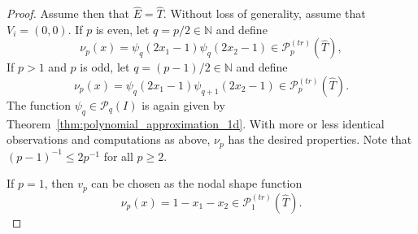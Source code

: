 \documentclass[english, 12pt, a4paper, sci, utf8, a-2b, online]{aaltothesis}
\theoremstyle{definition}
\theoremstyle{plain}
\numberwithin{equation}{section}
\begin{document}
\begin{proof}
    Assume then that $\widehat{E} = \widehat{T}$.
    Without loss of generality, assume that $V_i = (0,0)$.
    If $p$ is even, let $q = p/2 \in \mathbb{N}$ and define
    \begin{equation*}
        \nu_p(x) = \psi_q(2x_1-1) \psi_q(2x_2-1)
        \in \mathcal{P}_p^{(tr)}(\widehat{T}),
    \end{equation*}
    If $p > 1$ and $p$ is odd, let $q = (p-1)/2 \in \mathbb{N}$ and define
    \begin{equation*}
        \nu_p(x) = \psi_q(2x_1-1) \psi_{q+1}(2x_2-1)
        \in \mathcal{P}_p^{(tr)}(\widehat{T}).
    \end{equation*}
    The function $\psi_q \in \mathcal{P}_q(I)$ is again given by 
    Theorem~\ref{thm:polynomial_approximation_1d}.
    With more or less identical observations and computations as above,
    $\nu_p$ has the desired properties.
    Note that $(p-1)^{-1} \leq 2p^{-1}$ for all $p \geq 2$.

    If $p = 1$, then $v_p$ can be chosen as the nodal shape function
    \begin{equation*}
        \nu_p(x) = 1-x_1-x_2 \in \mathcal{P}_1^{(tr)}(\widehat{T}).
    \end{equation*}
\end{proof}
\end{document}
